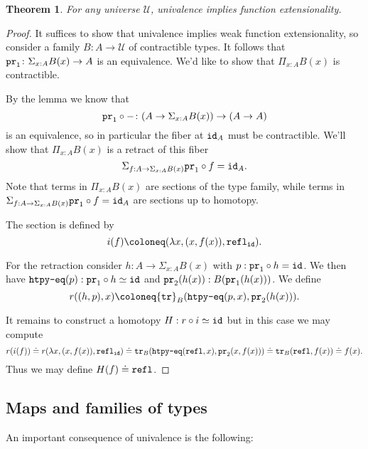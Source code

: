 \documentclass{amsart}
\theoremstyle{theorem}
\newtheorem*{thm}{Theorem}
\theoremstyle{definition}
\theoremstyle{remark}
\newcommand{\0}{\mathbbe{0}}
\newcommand{\1}{\mathbbe{1}}
\newcommand{\2}{\mathbbe{2}}
\newcommand{\3}{\mathbbe{3}}
\newcommand{\4}{\mathbbe{4}}
\newcommand{\term}[1]{{\textup{\texttt{#1}}}}
\newcommand{\id}{\term{id}}
\newcommand{\pr}{\term{pr}}
\newcommand{\refl}{\term{refl}}
\newcommand{\tr}{\term{tr}}
\newcommand{\UU}{{\mathcal{U}}}
\begin{document}
\begin{thm} For any universe $\UU$, univalence implies function extensionality.
\end{thm}
\begin{proof} It suffices to show that univalence implies weak function extensionality, so consider a family $B \colon A \to \UU$ of contractible types. It follows that $\pr_1 \colon \Sigma_{x:A} B(x) \to A$ is an equivalence. We'd like to show that $\Pi_{x:A} B(x)$ is contractible.

By the lemma we know that
\[ \pr_1 \circ - \colon (A \to \Sigma_{x:A}B(x)) \to (A \to A)\]
is an equivalence, so in particular the fiber at $\id_A$ must be contractible. We'll show that $\Pi_{x:A} B(x)$ is a retract of this fiber
\[ \Sigma_{f: A \to  \Sigma_{x:A}B(x)} \pr_1 \circ f = \id_A.\]
Note that terms in  $\Pi_{x:A} B(x)$ are sections of the type family, while terms in $\Sigma_{f: A \to  \Sigma_{x:A}B(x)} \pr_1 \circ f = \id_A$ are sections up to homotopy.

The section is defined by
\[ i(f) \coloneq (\lambda x, (x,f(x)), \refl_\id).\]

For the retraction consider $h : A \to \Sigma_{x:A}B(x)$ with $p : \pr_1 \circ h = \id$. We then have $\term{htpy-eq}(p) : \pr_1 \circ h \simeq \id$ and $\pr_2(h(x)) :B(\pr_1(h(x)))$. We define
\[ r((h,p),x) \coloneq \tr_B (\term{htpy-eq}(p,x), \pr_2(h(x))).\]

It remains to construct a homotopy $H : r \circ i \simeq \id$ but in this case we may compute
\[ r(i(f)) \doteq r(\lambda x, (x,f(x)), \refl_\id) \doteq \tr_B(\term{htpy-eq}(\refl,x),\pr_2(x,f(x))) \doteq \tr_B(\refl,f(x)) \doteq f(x).\]
Thus we may define $H(f) \doteq \refl$.
\end{proof}

\subsection*{Maps and families of types}

An important consequence of univalence is the following:
\end{document}
